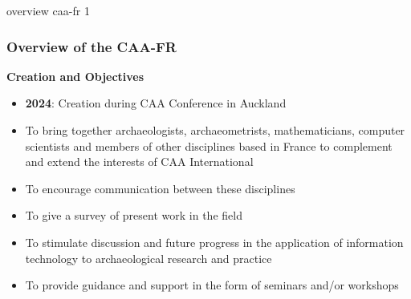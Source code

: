 \documentclass[t,aspectratio=169,xcolor=dvipsnames]{beamer}
\begin{document}
\begin{frame}{overview caa-fr 1}

    \frametitle{Overview of the CAA-FR} 


    \begin{block}{\textbf{Creation and Objectives}} %
       
        \begin{itemize}
            \item \textbf{2024}: Creation during CAA Conference in Auckland
            \item To bring together archaeologists, archaeometrists, mathematicians, computer scientists and members of other disciplines based in France to complement and extend the interests of CAA International
            \item To encourage communication between these disciplines
            \item To give a survey of present work in the field
            \item To stimulate discussion and future progress in the application of information technology to archaeological research and practice
            \item To provide guidance and support in the form of seminars and/or workshops
        \end{itemize}

    \end{block}

    \end{frame}

\end{document}
